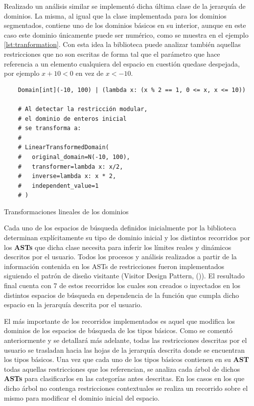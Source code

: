 Realizado un análisis similar se implementó dicha última clase de la jerarquía de dominios. 
La misma, al igual que la clase implementada para los dominios segmentados, contiene uno de los dominios básicos en su interior,
aunque en este caso este dominio únicamente puede ser numérico, como se muestra en el ejemplo \ref{lst:tranformation}. 
Con esta idea la biblioteca puede analizar también aquellas restricciones que no son escritas de forma tal que el parámetro 
que hace referencia a un elemento cualquiera del espacio en cuestión quedase despejada, por ejemplo $x + 10 < 0$ en vez de $x < -10$. 

\begin{listing}[!ht]
    \begin{verbatim}
    Domain[int](-10, 100) | (lambda x: (x % 2 == 1, 0 <= x, x <= 10))
  
    # Al detectar la restricción modular, 
    # el dominio de enteros inicial 
    # se transforma a:
    # 
    # LinearTransformedDomain(
    #   original_domain=N(-10, 100), 
    #   transformer=lambda x: x/2,   
    #   inverse=lambda x: x * 2,         
    #   independent_value=1
    # )
    \end{verbatim}
    \caption{Transformaciones lineales de los dominios}
    \label{lst:tranformation}
\end{listing}

Cada uno de los espacios de búsqueda definidos inicialmente por la biblioteca determinan explícitamente su tipo de dominio
inicial y los distintos recorridos por los {\bf ASTs} que dicha clase necesita para inferir los límites reales y dinámicos
descritos por el usuario. Todos los procesos y análisis realizados a partir de la información contenida en los ASTs de
restricciones fueron implementados siguiendo el patrón de diseño visitante (Visitor Design Pattern, (\cite{vistorpattern})). El resultado final
cuenta con 7 de estos recorridos los cuales son creados o inyectados en los distintos espacios de búsqueda en dependencia
de la función que cumpla dicho espacio en la jerarquía descrita por el usuario.

El más importante de los recorridos implementados es aquel que modifica los dominios de los espacios de búsqueda de los
tipos básicos. Como se comentó anteriormente y se detallará más adelante, todas las restricciones descritas por el usuario
se trasladan hacia las hojas de la jerarquía descrita donde se encuentran los tipos básicos. Una vez que cada uno de los
tipos básicos contienen en su {\bf AST} todas aquellas restricciones que los referencian, se analiza cada árbol de dichos {\bf ASTs}
para clasificarlos en las categorías antes descritas. En los casos en los que dicho árbol no contenga restricciones
contextuales se realiza un recorrido sobre el mismo para modificar el dominio inicial del espacio.

